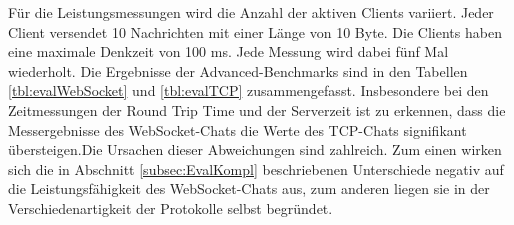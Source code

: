 \documentclass[11pt,a4paper,titlepage]{scrartcl}
\numberwithin{equation}{section}
\begin{document}
\noindent Für die Leistungsmessungen wird die Anzahl der aktiven Clients variiert. Jeder Client versendet 10 Nachrichten mit einer Länge von 10 Byte. Die Clients haben eine maximale Denkzeit von 100 ms. Jede Messung wird dabei fünf Mal wiederholt. Die Ergebnisse der Advanced-Benchmarks sind in den Tabellen \ref{tbl:evalWebSocket} und \ref{tbl:evalTCP} zusammengefasst. Insbesondere bei den Zeitmessungen der Round Trip Time und der Serverzeit ist zu erkennen, dass die Messergebnisse des WebSocket-Chats die Werte des TCP-Chats signifikant übersteigen.Die Ursachen dieser Abweichungen sind zahlreich. Zum einen wirken sich die in Abschnitt \ref{subsec:EvalKompl} beschriebenen Unterschiede negativ auf die Leistungsfähigkeit des WebSocket-Chats aus, zum anderen liegen sie in der Verschiedenartigkeit der Protokolle selbst begründet. \\
\end{document}
